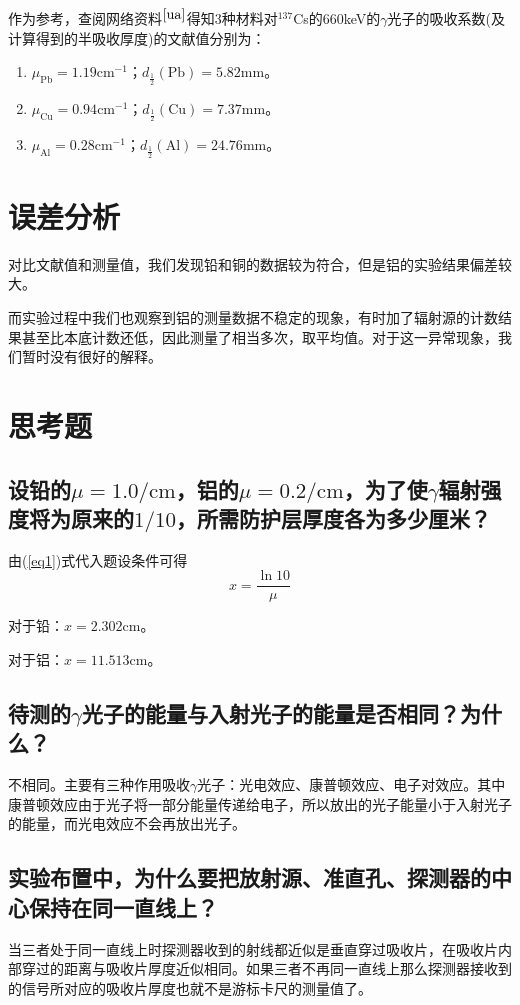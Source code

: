 \documentclass[a4paper]{article}
\begin{document}
作为参考，查阅网络资料$^{\cite{ua}}$得知3种材料对$^{137}$Cs的660keV的$\gamma$光子的吸收系数(及计算得到的半吸收厚度)的文献值分别为：
\begin{enumerate}
\item $\mu_{\text{Pb}} = 1.19\text{cm}^{-1}$；$d_{\frac12}(\text{Pb}) = 5.82\text{mm}$。
\item $\mu_{\text{Cu}} = 0.94\text{cm}^{-1}$；$d_{\frac12}(\text{Cu}) = 7.37\text{mm}$。
\item $\mu_{\text{Al}} = 0.28\text{cm}^{-1}$；$d_{\frac12}(\text{Al}) = 24.76\text{mm}$。
\end{enumerate}

\section{误差分析}
对比文献值和测量值，我们发现铅和铜的数据较为符合，但是铝的实验结果偏差较大。

而实验过程中我们也观察到铝的测量数据不稳定的现象，有时加了辐射源的计数结果甚至比本底计数还低，因此测量了相当多次，取平均值。对于这一异常现象，我们暂时没有很好的解释。

\section{思考题}
\subsection{设铅的$\mu = 1.0\text{/cm}$，铝的$\mu = 0.2\text{/cm}$，为了使$\gamma$辐射强度将为原来的$1/10$，所需防护层厚度各为多少厘米？}
由(\ref{eq1})式代入题设条件可得
\begin{equation}
x = \frac{\ln 10}{\mu}
\end{equation}

对于铅：$x = 2.302\text{cm}$。

对于铝：$x = 11.513\text{cm}$。

\subsection{待测的$\gamma$光子的能量与入射光子的能量是否相同？为什么？}
不相同。主要有三种作用吸收$\gamma$光子：光电效应、康普顿效应、电子对效应。其中康普顿效应由于光子将一部分能量传递给电子，所以放出的光子能量小于入射光子的能量，而光电效应不会再放出光子。

\subsection{实验布置中，为什么要把放射源、准直孔、探测器的中心保持在同一直线上？}
当三者处于同一直线上时探测器收到的射线都近似是垂直穿过吸收片，在吸收片内部穿过的距离与吸收片厚度近似相同。如果三者不再同一直线上那么探测器接收到的信号所对应的吸收片厚度也就不是游标卡尺的测量值了。
\end{document}
